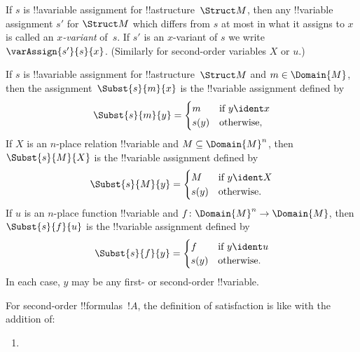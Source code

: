 \documentclass[../../../include/open-logic-section]{subfiles}
\begin{document}
\begin{defn}[$x$-Variant]
If $s$ is !!a{variable} assignment for !!a{structure}~$\Struct M$,
then any !!{variable} assignment $s'$ for $\Struct M$ which differs
from $s$ at most in what it assigns to $x$ is called an
\emph{$x$-variant} of~$s$.  If $s'$ is an $x$-variant of $s$ we write
$\varAssign{s'}{s}{x}$. (Similarly for second-order variables $X$ or $u$.)
\end{defn}

\begin{defn}
  If $s$ is !!a{variable} assignment for !!a{structure}~$\Struct M$
  and $m \in \Domain{M}$, then the assignment~$\Subst{s}{m}{x}$ is the
  !!{variable} assignment defined by
  \[\Subst{s}{m}{y} = \begin{cases}
    m & \text{if } y \ident x\\
    s(y) & \text{otherwise},
  \end{cases}\]
  If $X$ is an $n$-place relation !!{variable} and $M \subseteq
  \Domain{M}^n$, then $\Subst{s}{M}{X}$ is the !!{variable} assignment
  defined by
  \[\Subst{s}{M}{y} = \begin{cases}
    M & \text{if } y \ident X\\
    s(y) & \text{otherwise}. 
  \end{cases}\]
  If $u$ is an $n$-place function !!{variable} and $f\colon \Domain{M}^n
  \to \Domain{M}$, then $\Subst{s}{f}{u}$ is the !!{variable} assignment
  defined by
  \[\Subst{s}{f}{y} = \begin{cases}
    f & \text{if } y \ident u\\
    s(y) & \text{otherwise}.
  \end{cases}\]
  In each case, $y$ may be any first- or second-order !!{variable}.
\end{defn}

\begin{defn}[Satisfaction]
For second-order !!{formula}s~$!A$, the definition of satisfaction is
like  with the addition of:
\begin{enumerate}
\item {}



\end{enumerate}
\end{defn}
\end{document}
